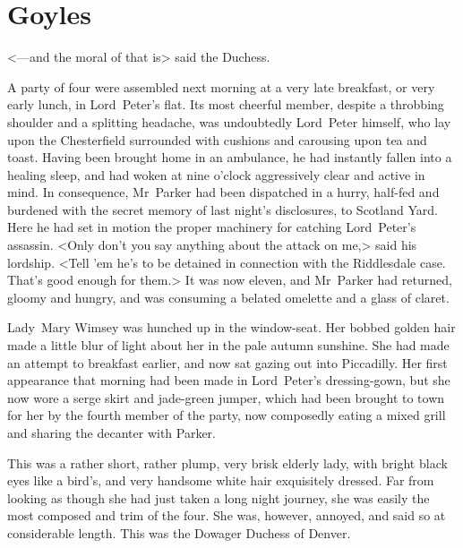

\chapter{Goyles}

\epigraph{<—and the moral of that is\longdash> said the Duchess.}{}


\lettrine{A}{} party of four were assembled next morning at a very late breakfast, or very early lunch, in Lord~Peter's flat. Its most cheerful member, despite a throbbing shoulder and a splitting headache, was undoubtedly Lord~Peter himself, who lay upon the Chesterfield surrounded with cushions and carousing upon tea and toast. Having been brought home in an ambulance, he had instantly fallen into a healing sleep, and had woken at nine o'clock aggressively clear and active in mind. In consequence, Mr~Parker had been dispatched in a hurry, half-fed and burdened with the secret memory of last night's disclosures, to Scotland Yard. Here he had set in motion the proper machinery for catching Lord~Peter's assassin. <Only don't you say anything about the attack on me,> said his lordship. <Tell 'em he's to be detained in connection with the Riddlesdale case. That's good enough for them.> It was now eleven, and Mr~Parker had returned, gloomy and hungry, and was consuming a belated omelette and a glass of claret.

Lady~Mary Wimsey was hunched up in the window-seat. Her bobbed golden hair made a little blur of light about her in the pale autumn sunshine.  She had made an attempt to breakfast earlier, and now sat gazing out into Piccadilly. Her first appearance that morning had been made in Lord~Peter's dressing-gown, but she now wore a serge skirt and jade-green jumper, which had been brought to town for her by the fourth member of the party, now composedly eating a mixed grill and sharing the decanter with Parker.

This was a rather short, rather plump, very brisk elderly lady, with bright black eyes like a bird's, and very handsome white hair exquisitely dressed. Far from looking as though she had just taken a long night journey, she was easily the most composed and trim of the four. She was, however, annoyed, and said so at considerable length.  This was the Dowager Duchess of Denver.

